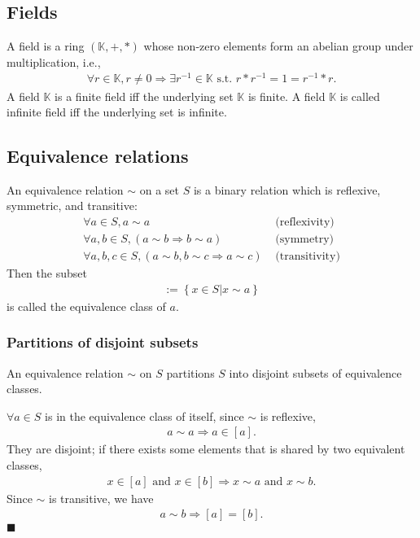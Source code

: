 \documentclass[11pt]{book}
\begin{document}
\subsection{Fields}
A field is a ring $(\mathbb{K},+,*)$ whose non-zero elements form an abelian group under multiplication, i.e.,
\begin{eqnarray}
\forall r \in \mathbb{K}, r \neq 0 \Rightarrow \exists r^{-1} \in \mathbb{K} \text{ s.t. } r*r^{-1} = 1 = r^{-1}*r.
\end{eqnarray}
A field $\mathbb{K}$ is a finite field iff the underlying set $\mathbb{K}$ is finite.
A field $\mathbb{K}$ is called infinite field iff the underlying set is infinite.

\subsection{Equivalence relations}
An equivalence relation $\sim$ on a set $S$ is a binary relation which is reflexive, symmetric, and transitive:
\begin{eqnarray}
\forall a \in S, a \sim a & \text{ (reflexivity)} \\
\forall a,b \in S, (a \sim b \Rightarrow b \sim a) & \text{ (symmetry)} \\
\forall a,b,c \in S, (a \sim b, b \sim c \Rightarrow a \sim c) & \text{ (transitivity)} 
\end{eqnarray}
Then the subset
\begin{eqnarray}
[a] := \left\{\left. x \in S \right| x \sim a \right\}
\end{eqnarray}
is called the equivalence class of $a$.

\subsubsection{Partitions of disjoint subsets}
An equivalence relation $\sim$ on $S$ partitions $S$ into disjoint subsets of equivalence classes.

$\forall a \in S$ is in the equivalence class of itself, since $\sim$ is reflexive,
\begin{eqnarray}
a \sim a \Rightarrow a \in [a].
\end{eqnarray}
They are disjoint; if there exists some elements that is shared by two equivalent classes,
\begin{eqnarray}
x \in [a] \text{ and } x \in [b] \Rightarrow x \sim a \text{ and } x \sim b.
\end{eqnarray}
Since $\sim$ is transitive, we have
\begin{eqnarray}
a \sim b \Rightarrow [a] = [b].
\end{eqnarray}
$\blacksquare$
\end{document}
